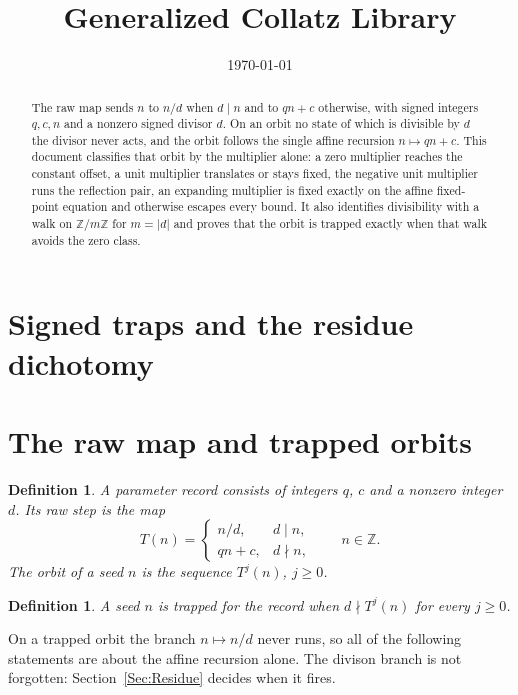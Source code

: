\documentclass[11pt,letterpaper]{article}
\title{Generalized Collatz Library}
\author{}
\date{\today}
\newcommand{\Z}{\mathbb{Z}}
\newtheorem{definition}[theorem]{Definition}
\begin{document}
\maketitle
\section*{Signed traps and the residue dichotomy}

\begin{abstract}
The raw map sends \(n\) to \(n/d\) when \(d\mid n\) and to \(qn+c\)
otherwise, with signed integers \(q,c,n\) and a nonzero signed divisor \(d\).
On an orbit no state of which is divisible by \(d\) the divisor never acts, and
the orbit follows the single affine recursion \(n\mapsto qn+c\). This document
classifies that orbit by the multiplier alone: a zero multiplier reaches the
constant offset, a unit multiplier translates or stays fixed, the negative
unit multiplier runs the reflection pair, an expanding multiplier is fixed
exactly on the affine fixed-point equation and otherwise escapes every bound.
It also identifies divisibility with a walk on \(\Z/m\Z\) for \(m=|d|\) and
proves that the orbit is trapped exactly when that walk avoids the zero class.
\end{abstract}

\section{The raw map and trapped orbits}

\begin{definition}\label{Def:Map}
A parameter record consists of integers \(q\), \(c\) and a nonzero integer
\(d\). Its raw step is the map
\[
T(n)=\begin{cases} n/d, & d\mid n,\\ qn+c, & d\nmid n,\end{cases}
\qquad n\in\Z .
\]
The orbit of a seed \(n\) is the sequence \(T^{j}(n)\), \(j\ge0\).
\end{definition}

\begin{definition}\label{Def:Trapped}
A seed \(n\) is \emph{trapped} for the record when \(d\nmid T^{j}(n)\) for
every \(j\ge0\).
\end{definition}

On a trapped orbit the branch \(n\mapsto n/d\) never runs, so all of the
following statements are about the affine recursion alone. The divison branch
is not forgotten: Section~\ref{Sec:Residue} decides when it fires.
\end{document}
